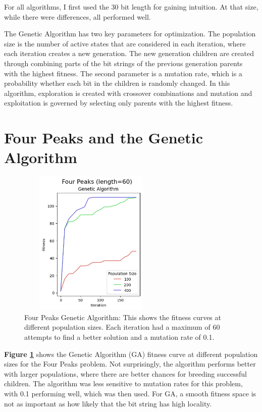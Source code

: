 \documentclass[letterpaper]{article} %
\begin{document}
For all algorithms, I first used the 30 bit length for gaining intuition.  At that size, while there were differences, all performed well.

The Genetic Algorithm has two key parameters for optimization.  The population size is the number of active states that are considered in each iteration, where each iteration creates a new generation.  The new generation children are  created through combining parts of the bit strings of the previous generation parents with the highest fitness.  The second parameter is a mutation rate, which is a probability whether each bit in the children is randomly changed.  In this algorithm, exploration is created with crossover combinations and mutation and exploitation is governed by selecting only parents with the highest fitness.

\section{Four Peaks and the Genetic Algorithm}
\begin{figure}[!htb]
\centering
\includegraphics[width=2.75in, height=2.75in]{figures/Four_Peaks_length=60_Genetic_Algorithm_l_60_ma_60_p_100__200__400_mu_0.1_.png}
\caption{Four Peaks Genetic Algorithm:  This shows the fitness curves at different population sizes. Each iteration had a maximum of 60 attempts to find a better solution and a mutation rate of 0.1. }
\label{fig:four_peaks_ga}
\end{figure}

 \textbf{Figure \ref{fig:four_peaks_ga}} shows the Genetic Algorithm (GA) fitness curve at different population sizes for the Four Peaks problem.  Not surprisingly, the algorithm performs better with larger populations, where there are better chances for breeding successful children.  The algorithm was less sensitive to mutation rates for this problem, with 0.1 performing well, which was then used.  For GA, a smooth fitness space is not as important as how likely that the bit string has high locality.
\end{document}
